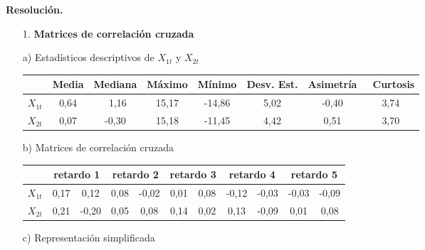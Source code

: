 \begin{enumerate}
\textbf{Resoluci\'{o}n.}

\begin{enumerate}
      \item[1.] {\bf Matrices de correlación cruzada} 
\end{enumerate}

\begin{itemize}
      \item[a)] Estad\'{i}sticos descriptivos de $X_{1t}$ y $X_{2t}$
\begin{table}[H]
\centering
\begin{tabular}{cccccccc}\hline
~& Media & Mediana & M\'{a}ximo & M\'{i}nimo & Desv. Est. & Asimetr\'{i}a & ~Curtosis \\ \hline
$X_{1t}$ & 0,64 & ~1,16 & 15,17 & -14,86 & 5,02 & -0,40 & 3,74 \\
$X_{2t}$ & 0,07 & -0,30 & 15,18 & -11,45 & 4,42 & 0,51 & 3,70 \\ \hline
\end{tabular}
\label{tab30}
\end{table}

      \item[b)] Matrices de correlaci\'{o}n cruzada

\begin{table}[H]
\centering
\begin{tabular}{ccccccccccc}\hline
& \multicolumn{2}{c}{retardo 1} & \multicolumn{2}{c}{retardo 2} & \multicolumn{2}{c}{retardo 3} & 
\multicolumn{2}{c}{retardo 4} & \multicolumn{2}{c}{retardo 5} \\ \hline
$X_{1t}$ & 0,17 & 0,12 & 0,08 & -0,02 & 0,01 & 0,08 & -0,12 & -0,03 & -0,03 & -0,09 \\
$X_{2t}$ & 0,21 & -0,20 & 0,05 & 0,08 & 0,14 & 0,02 & 0,13 & -0,09 & 0,01 & 0,08 \\ \hline
\end{tabular}
\label{tab31}
\end{table}

      \item[c)] Representación simplificada


\end{itemize}
\end{enumerate}
